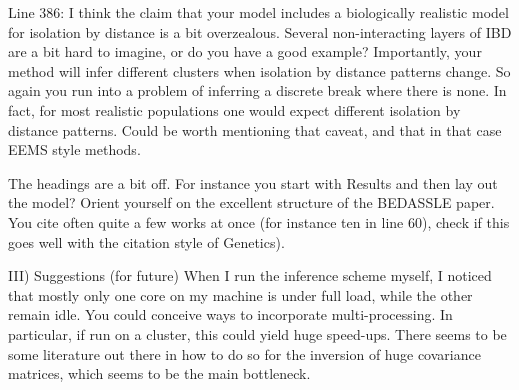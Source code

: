 
\begin{point}{}
    Line 386: I think the claim that your model includes a biologically realistic model for isolation by distance is a bit overzealous. 
 Several non-interacting layers of IBD are a bit hard to imagine, 
 or do you have a good example?
 Importantly, your method will infer different clusters when isolation by distance patterns change. 
 So again you run into a problem of inferring a discrete break where there is none. 
 In fact, for most realistic populations one would expect different isolation by distance patterns.
  Could be worth mentioning that caveat, and that in that case EEMS style methods.
\end{point}


\begin{point}{}
    The headings are a bit off. 
For instance you start with Results and then lay out the model? 
Orient yourself on the excellent structure of the BEDASSLE paper.
 You cite often quite a few works at once (for instance ten in line 60), 
 check if this goes well with the citation style of Genetics).
\end{point}


\begin{point}{}
    III) Suggestions (for future)
 When I run the inference scheme myself, 
 I noticed that mostly only one core on my machine is under full load, while the other remain idle. 
 You could conceive ways to incorporate multi-processing. 
 In particular, if run on a cluster, this could yield huge speed-ups. 
 There seems to be some literature out there in how to do so for the inversion of huge covariance matrices, 
 which seems to be the main bottleneck.
\end{point}

 
